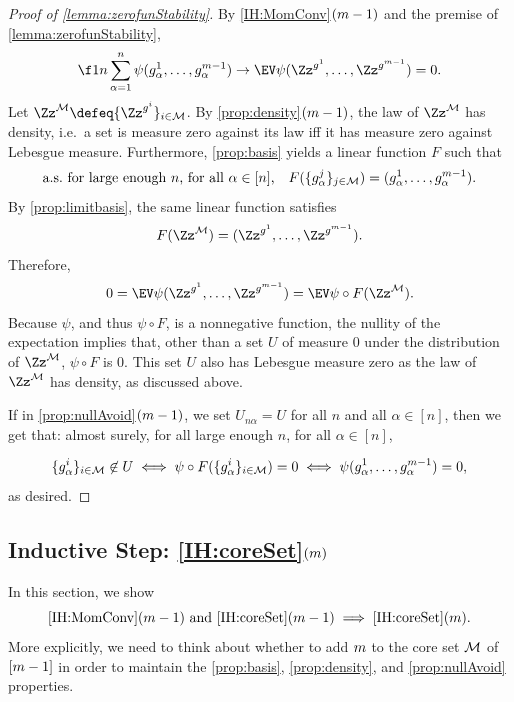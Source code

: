 \documentclass[main.tex]{subfiles}
\begin{document}
\begin{proof}[Proof of \cref{lemma:zerofunStability}]
By \ref{IH:MomConv}$(m-1)$ and the premise of \cref{lemma:zerofunStability},
\begin{align*}
\f 1 n \sum_{\alpha = 1}^n \psi(g^1_\alpha, \ldots, g^{\MM-1}_\alpha) \to \EV \psi(\Zz^{g^1}, \ldots, \Zz^{g^{\MM-1}}) = 0.
\end{align*}
Let $\Zz^\coreset \defeq \{\Zz^{g^i}\}_{i \in \coreset}$.
By \ref{prop:density}$(m-1)$, the law of $\Zz^\coreset$ has density, i.e.\ a set is measure zero against its law iff it has measure zero against Lebesgue measure.
Furthermore, \ref{prop:basis} yields a linear function $F$ such that
\[\text{a.s.\ for large enough $n$, for all $\alpha \in [n]$,}\quad
F(\{g^j_\alpha\}_{j \in \mathcal{M}}) = (g^1_\alpha, \ldots, g^{m-1}_\alpha)
.
\]
By \cref{prop:limitbasis}, the same linear function satisfies
\[F(\Zz^\coreset) = (\Zz^{g^1}, \ldots, \Zz^{g^{\MM-1}})
.\]
Therefore,
\begin{equation*}
0 = \EV \psi(\Zz^{g^1}, \ldots, \Zz^{g^{\MM-1}})
= \EV \psi \circ F(\Zz^\coreset)
.
\end{equation*}
Because $\psi$, and thus $\psi \circ F$, is a nonnegative function, the nullity of the expectation implies that, other than a set $U$ of measure 0 under the distribution of $\Zz^\coreset$, $\psi\circ F$ is 0.
This set $U$ also has Lebesgue measure zero as the law of $\Zz^\coreset$ has density, as discussed above.

If in \ref{prop:nullAvoid}$(m-1)$, we set $U_{n\alpha} = U$ for all $n$ and all $\alpha \in [n]$, then we get that: almost surely, for all large enough $n$, for all $\alpha \in [n]$,

\begin{equation*}
\{g^i_\alpha\}_{i \in \mathcal{M}} \not\in U
\iff
\psi\circ F(\{g^i_\alpha\}_{i \in \mathcal{M}}) = 0
\iff
\psi(g^1_\alpha, \ldots, g^{m-1}_\alpha) = 0,
\end{equation*}
as desired.
\end{proof}

\subsection{Inductive Step: \ref{IH:coreSet}\texorpdfstring{$(m)$}{(m)}}
\label{sec:inductiveCoreSet}
In this section, we show
\begin{equation*}
\text{\ref{IH:MomConv}$(m-1)$ and \ref{IH:coreSet}$(m-1)$} \implies \text{\ref{IH:coreSet}}(m).
\end{equation*}
More explicitly, we need to think about whether to add $m$ to the core set $\mathcal{M}$ of $[m-1]$ in order to maintain the \ref{prop:basis}, \ref{prop:density}, and \ref{prop:nullAvoid} properties.
\end{document}
